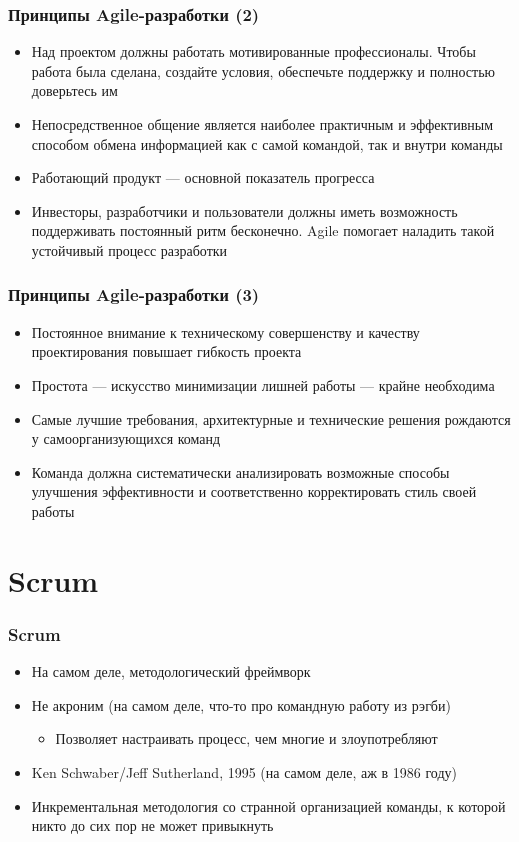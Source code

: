 \documentclass{../../slides-style}
\begin{document}
    \begin{frame}
        \frametitle{Принципы Agile-разработки (2)}
        \begin{itemize}
            \item Над проектом должны работать мотивированные профессионалы. Чтобы работа была сделана, создайте условия, обеспечьте поддержку и полностью доверьтесь им
            \item Непосредственное общение является наиболее практичным и эффективным способом обмена информацией как с самой командой, так и внутри команды
            \item Работающий продукт --- основной показатель прогресса
            \item Инвесторы, разработчики и пользователи должны иметь возможность поддерживать постоянный ритм бесконечно. Agile помогает наладить такой устойчивый процесс разработки
        \end{itemize}
    \end{frame}

    \begin{frame}
        \frametitle{Принципы Agile-разработки (3)}
        \begin{itemize}
            \item Постоянное внимание к техническому совершенству и качеству проектирования повышает гибкость проекта
            \item Простота --- искусство минимизации лишней работы --- крайне необходима
            \item Самые лучшие требования, архитектурные и технические решения рождаются у самоорганизующихся команд
            \item Команда должна систематически анализировать возможные способы улучшения эффективности и соответственно корректировать стиль своей работы
        \end{itemize}
    \end{frame}

    \section{Scrum}

    \begin{frame}
        \frametitle{Scrum}
        \begin{itemize}
            \item На самом деле, методологический фреймворк
            \item Не акроним (на самом деле, что-то про командную работу из рэгби)
            \begin{itemize}
                \item Позволяет настраивать процесс, чем многие и злоупотребляют
            \end{itemize}
            \item Ken Schwaber/Jeff Sutherland, 1995 (на самом деле, аж в 1986 году)
            \item Инкрементальная методология со странной организацией команды, к которой никто до сих пор не может привыкнуть
        \end{itemize}
    \end{frame}
\end{document}
